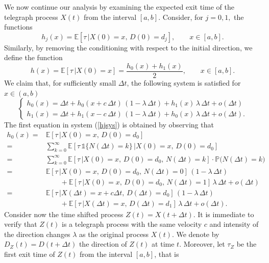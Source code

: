 \documentclass{article}
\begin{document}
We now continue our analysis by examining the expected exit time of the telegraph process $X(t)$ from the interval $[a,b]$. Consider, for $j=0,1,$ the functions \begin{equation}h_j(x)=\mathbb{E}\left[\tau\,\Big\lvert X(0)=x,\,D(0)=d_j\right],\qquad x\in[a,b].\label{hjdef}\end{equation} Similarly, by removing the conditioning with respect to the initial direction, we define the function
\begin{equation}h(x)=\mathbb{E}\left[\tau\,\Big\lvert X(0)=x\right]=\frac{h_0(x)+h_1(x)}{2},\qquad x\in[a,b].\label{hdef}\end{equation} We claim that, for sufficiently small $\Delta t$, the following system is satisfied for $x\in(a,b)$
\begin{equation}\label{hjsys}
\begin{cases}
h_0(x)=\Delta t+h_0(x+c\,\Delta t)\,(1-\lambda\,\Delta t)+h_1(x)\,\lambda\,\Delta t + o(\Delta t)\\
h_1(x)=\Delta t+h_1(x-c\,\Delta t)\,(1-\lambda\,\Delta t)+h_0(x)\,\lambda\,\Delta t + o(\Delta t).
\end{cases}
\end{equation}
The first equation in system (\ref{hjsys}) is obtained by observing that
\begin{align}
h_0(x)=&\mathbb{E}\left[\tau\,\Big\lvert X(0)=x,\,D(0)=d_0\right]\nonumber\\
=&\sum_{k=0}^{\infty}\mathbb{E}\left[\tau\,\mathds{1}\{N(\Delta t)=k\}\,\Big\lvert X(0)=x,\,D(0)=d_0\right]\nonumber\\
=&\sum_{k=0}^{\infty}\mathbb{E}\left[\tau\,\Big\lvert X(0)=x,\,D(0)=d_0,\,N(\Delta t)=k\right]\cdot \mathbb{P}\big(N(\Delta t)=k\big)\nonumber\\
=&\mathbb{E}\left[\tau\,\Big\lvert X(0)=x,\,D(0)=d_0,\,N(\Delta t)=0\right]\,(1-\lambda\,\Delta t)\nonumber\\
&\qquad+\mathbb{E}\left[\tau\,\Big\lvert X(0)=x,\,D(0)=d_0,\,N(\Delta t)=1\right]\,\lambda\,\Delta t+o(\Delta t)\nonumber\\
=&\mathbb{E}\left[\tau\,\Big\lvert X(\Delta t)=x+c\Delta t,\,D(\Delta t)=d_0\right]\,(1-\lambda\,\Delta t)\nonumber\\
&\qquad+\mathbb{E}\left[\tau\,\Big\lvert X(\Delta t)=x,\,D(\Delta t)=d_1\right]\,\lambda\,\Delta t+o(\Delta t).\label{stepdelic}
\end{align}
Consider now the time shifted process $Z(t)=X(t+\Delta t)$. It is immediate to verify that $Z(t)$ is a telegraph process with the same velocity $c$ and intensity of the direction changes $\lambda$ as the original process $X(t)$. We denote by $D_Z(t)=D(t+\Delta t)$ the direction of $Z(t)$ at time $t$. Moreover, let $\tau_Z$ be the first exit time of $Z(t)$ from the interval $[a,b]$, that is
\end{document}
